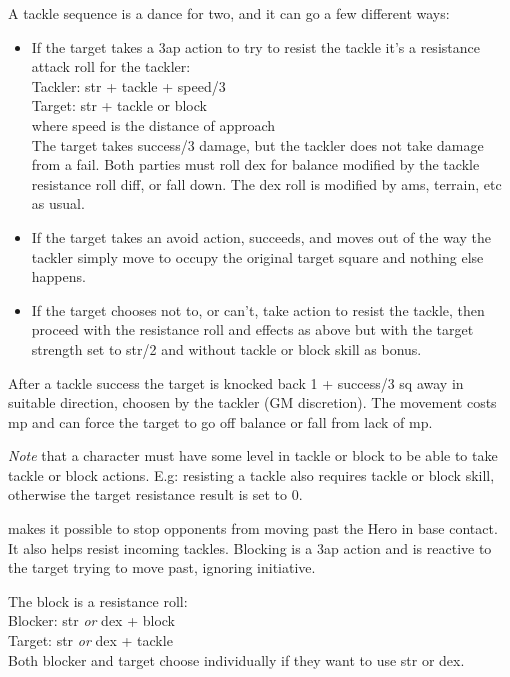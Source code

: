 A tackle sequence is a dance for two, and it can go a few different ways:
\begin{itemize}
    \item If the target takes a 3ap action to try to resist the tackle it's a resistance attack roll for the tackler:\\
    Tackler: str + tackle + speed/3 \\ 
    Target: str + tackle or block \\
    where speed is the distance of approach \\
    The target takes success/3 damage, but the tackler does not take damage from a fail. Both parties must roll dex for balance modified by the tackle resistance roll diff, or fall down. The dex roll is modified by ams, terrain, etc as usual.
    \item If the target takes an avoid action, succeeds, and moves out of the way the tackler simply move to occupy the original target square and nothing else happens.
    \item If the target chooses not to, or can't, take action to resist the tackle, then proceed with the resistance roll and effects as above but with the target strength set to str/2 and without tackle or block skill as bonus.
\end{itemize}
After a tackle success the target is knocked back 1 + success/3 sq away in suitable direction, choosen by the tackler (GM discretion). The movement costs mp and can force the target to go off balance or fall from lack of mp.

\emph{Note} that a character must have some level in tackle or block to be able to take tackle or block actions. E.g: resisting a tackle also requires tackle or block skill, otherwise the target resistance result is set to 0.


 makes it possible to stop opponents from moving past the Hero in base contact. It also helps resist incoming tackles. Blocking is a 3ap action and is reactive to the target trying to move past, ignoring initiative.

The block is a resistance roll: \\
Blocker: str \emph{or} dex + block \\
Target: str \emph{or} dex + tackle \\
Both blocker and target choose individually if they want to use str or dex.

